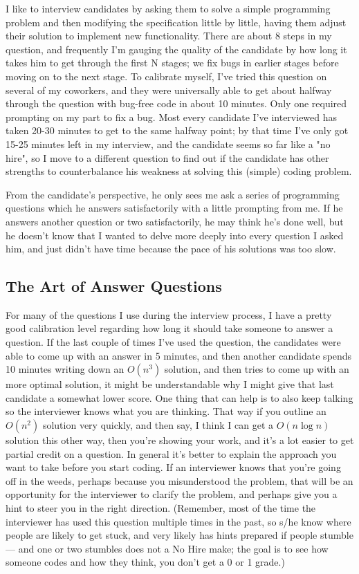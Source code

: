 \documentclass[12pt, reqno, oneside]{amsart}
\begin{document}
I like to interview candidates by asking them to solve a simple programming problem and then modifying the specification little by little, having them adjust their solution to implement new functionality. There are about 8 steps in my question, and frequently I'm gauging the quality of the candidate by how long it takes him to get through the first N stages; we fix bugs in earlier stages before moving on to the next stage. To calibrate myself, I've tried this question on several of my coworkers, and they were universally able to get about halfway through the question with bug-free code in about 10 minutes. Only one required prompting on my part to fix a bug. Most every candidate I've interviewed has taken 20-30 minutes to get to the same halfway point; by that time I've only got 15-25 minutes left in my interview, and the candidate seems so far like a "no hire", so I move to a different question to find out if the candidate has other strengths to counterbalance his weakness at solving this (simple) coding problem.

From the candidate's perspective, he only sees me ask a series of programming questions which he answers satisfactorily with a little prompting from me. If he answers another question or two satisfactorily, he may think he's done well, but he doesn't know that I wanted to delve more deeply into every question I asked him, and just didn't have time because the pace of his solutions was too slow.

\subsection{The Art of Answer Questions}
For many of the questions I use during the interview process, I have a pretty good calibration level regarding how long it should take someone to answer a question. If the last couple of times I've used the question, the candidates were able to come up with an answer in 5 minutes, and then another candidate spends 10 minutes writing down an $O(n^{3})$ solution, and then tries to come up with an more optimal solution, it might be understandable why I might give that last candidate a somewhat lower score.
One thing that can help is to also keep talking so the interviewer knows what you are thinking. That way if you outline an $O(n^{2})$ solution very quickly, and then say, I think I can get a $O(n \log n)$ solution this other way, then you're showing your work, and it's a lot easier to get partial credit on a question.
In general it's better to explain the approach you want to take before you start coding. If an interviewer knows that you're going off in the weeds, perhaps because you misunderstood the problem, that will be an opportunity for the interviewer to clarify the problem, and perhaps give you a hint to steer you in the right direction. (Remember, most of the time the interviewer has used this question multiple times in the past, so s/he know where people are likely to get stuck, and very likely has hints prepared if people stumble --- and one or two stumbles does not a No Hire make; the goal is to see how someone codes and how they think, you don't get a 0 or 1 grade.)
\end{document}
